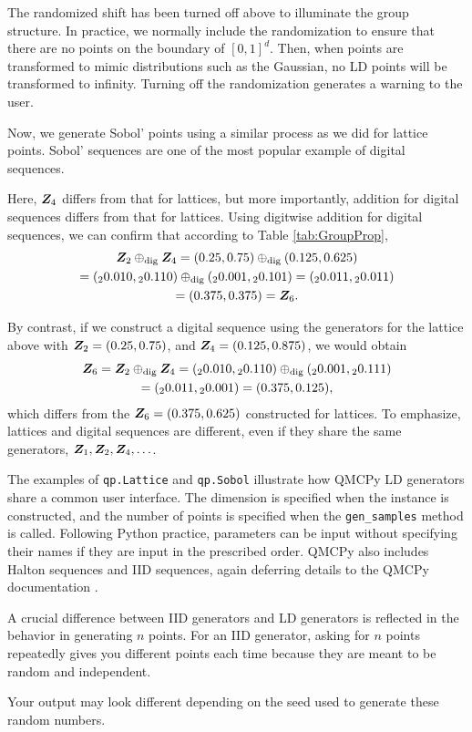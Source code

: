 \documentclass[graybox,footinfo]{svmult}
\newcommand{\dig}{\textup{dig}}
\begin{document}
The randomized shift has been turned off above to illuminate the group structure.  In practice, we normally include the randomization to ensure that there are no points on the boundary of $[0,1]^d$.  Then, when points are transformed to mimic distributions such as the Gaussian, no LD points will be transformed to infinity.  Turning off the randomization generates a warning to the user.

Now, we generate Sobol' points using a similar process as we did for lattice points.  Sobol' sequences are one of the most popular example of digital sequences.

Here, ${\boldsymbol{Z}}_4$ differs from that for lattices, but more importantly, addition for digital sequences differs from that for lattices.  Using digitwise addition for digital sequences, we can confirm that according to Table \ref{tab:GroupProp},
\begin{multline*}
\bsZ_2 \oplus_{\dig} \bsZ_4 = (0.25,0.75)  \oplus_{\dig} (0.125,0.625) \\
=  ({}_20.010,{}_20.110)  \oplus_{\dig} ({}_20.001,{}_20.101) = ({}_20.011,{}_20.011) \\
= (0.375,0.375) = \bsZ_6.
\end{multline*}

By contrast, if we construct a digital sequence using the generators for the lattice above with ${\boldsymbol{Z}}_2 = (0.25, 0.75)$, and ${\boldsymbol{Z}}_4 = (0.125, 0.875)$, we would obtain
\begin{multline*}
\bsZ_6 = \bsZ_2 \oplus_{\dig} \bsZ_4   = ({}_20.010,{}_20.110)  \oplus_{\dig} ({}_20.001,{}_20.111)  \\
= ({}_20.011,{}_20.001) = (0.375, 0.125),
\end{multline*}
which differs from the ${\boldsymbol{Z}}_6=(0.375, 0.625)$ constructed for lattices.  To emphasize, lattices and digital sequences are different, even if they share the same generators, ${\boldsymbol{Z}}_1, {\boldsymbol{Z}}_2, {\boldsymbol{Z}}_4, \ldots$.

The examples of \texttt{qp.Lattice} and \texttt{qp.Sobol} illustrate how QMCPy LD generators share a common user interface.  The dimension is specified when the instance is constructed, and the number of points is specified when the \texttt{gen\_samples} method is called.  Following Python practice, parameters can be input without specifying their names if they are input in the prescribed order.  QMCPy also includes Halton sequences and IID sequences, again deferring details to the QMCPy documentation \cite{QMCPyDocs}.

A crucial difference between IID generators and LD generators is reflected in the behavior in generating $n$ points.  For an IID generator, asking for $n$ points repeatedly gives you different points each time because they are meant to be random and independent.

Your output may look different depending on the seed used to generate these random numbers.
\end{document}
